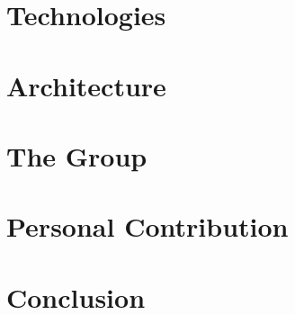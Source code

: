 \documentclass[a4paper,11pt]{article}
\begin{document}
    \section{Technologies}
    
    \section{Architecture}
    
    \section{The Group}
    
    \section{Personal Contribution}
    
    \section{Conclusion}
\end{document}
